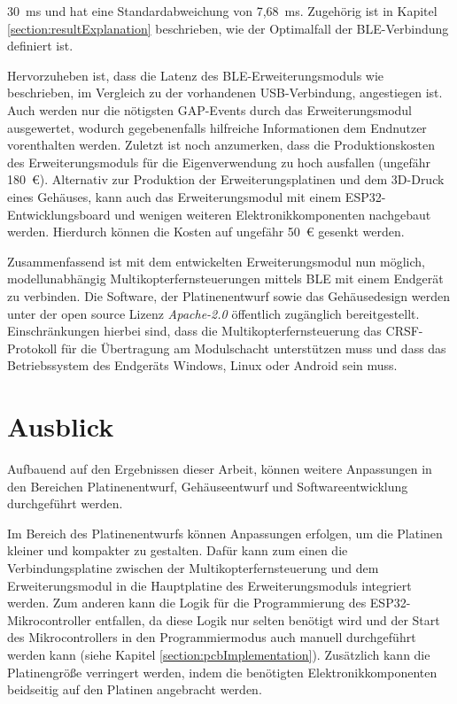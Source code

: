 30~ms und hat eine Standardabweichung von 7,68~ms. Zugehörig ist in Kapitel \ref{section:resultExplanation} beschrieben, wie der Optimalfall der \ac{BLE}-Verbindung definiert ist.

Hervorzuheben ist, dass die Latenz des \ac{BLE}-Erweiterungsmoduls wie beschrieben, im Vergleich zu der vorhandenen USB-Verbindung, angestiegen ist. Auch werden nur die nötigsten \ac{GAP}-Events durch das Erweiterungsmodul ausgewertet, wodurch gegebenenfalls hilfreiche Informationen dem Endnutzer vorenthalten werden. Zuletzt ist noch anzumerken, dass die Produktionskosten des Erweiterungsmoduls für die Eigenverwendung zu hoch ausfallen (ungefähr 180~€). Alternativ zur Produktion der Erweiterungsplatinen und dem 3D-Druck eines Gehäuses, kann auch das Erweiterungsmodul mit einem ESP32-Entwicklungsboard und wenigen weiteren Elektronikkomponenten nachgebaut werden. Hierdurch können die Kosten auf ungefähr 50~€ gesenkt werden. 

Zusammenfassend ist mit dem entwickelten Erweiterungsmodul nun möglich, modellunabhängig Multikopterfernsteuerungen mittels \ac{BLE} mit einem Endgerät zu verbinden. Die Software, der Platinenentwurf sowie das Gehäusedesign werden unter der open source Lizenz \textit{Apache-2.0} öffentlich zugänglich bereitgestellt. Einschränkungen hierbei sind, dass die Multikopterfernsteuerung das CRSF-Protokoll für die Übertragung am Modulschacht unterstützen muss und dass das Betriebssystem des Endgeräts Windows, Linux oder Android sein muss.

\section{Ausblick}
Aufbauend auf den Ergebnissen dieser Arbeit, können weitere Anpassungen in den Bereichen Platinenentwurf, Gehäuseentwurf und Softwareentwicklung durchgeführt werden.

Im Bereich des Platinenentwurfs können Anpassungen erfolgen, um die Platinen kleiner und kompakter zu gestalten. Dafür kann zum einen die Verbindungsplatine zwischen der Multikopterfernsteuerung und dem Erweiterungsmodul in die Hauptplatine des Erweiterungsmoduls integriert werden. Zum anderen kann die Logik für die Programmierung des ESP32-Mikrocontroller entfallen, da diese Logik nur selten benötigt wird und der Start des Mikrocontrollers in den Programmiermodus auch manuell durchgeführt werden kann (siehe Kapitel \ref{section:pcbImplementation}). Zusätzlich kann die Platinengröße verringert werden, indem die benötigten Elektronikkomponenten beidseitig auf den Platinen angebracht werden.


